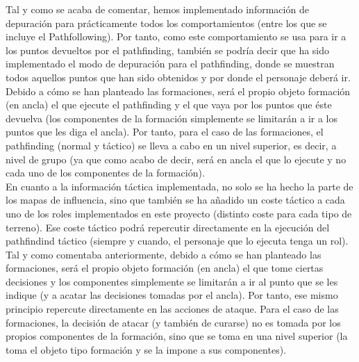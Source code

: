 Tal y como se acaba de comentar, hemos implementado información de depuración para prácticamente todos los comportamientos (entre los que se incluye el Pathfollowing). Por tanto, como este comportamiento se usa para ir a los puntos devueltos por el pathfinding, también se podría decir que ha sido implementado el modo de depuración para el pathfinding, donde se muestran todos aquellos puntos que han sido obtenidos y por donde el personaje deberá ir. \\

Debido a cómo se han planteado las formaciones, será el propio objeto formación (en ancla) el que ejecute el pathfinding y el que vaya por los puntos que éste devuelva (los componentes de la formación simplemente se limitarán a ir a los puntos que les diga el ancla). Por tanto, para el caso de las formaciones, el pathfinding (normal y táctico) se lleva a cabo en un nivel superior, es decir, a nivel de grupo (ya que como acabo de decir, será en ancla el que lo ejecute y no cada uno de los componentes de la formación). \\

En cuanto a la información táctica implementada, no solo se ha hecho la parte de los mapas de influencia, sino que también se ha añadido un coste táctico a cada uno de los roles implementados en este proyecto (distinto coste para cada tipo de terreno). Ese coste táctico podrá repercutir directamente en la ejecución del pathfindind táctico (siempre y cuando, el personaje que lo ejecuta tenga un rol). \\

Tal y como comentaba anteriormente, debido a cómo se han planteado las formaciones, será el propio objeto formación (en ancla) el que tome ciertas decisiones y los componentes simplemente se limitarán a ir al punto que se les indique (y a acatar las decisiones tomadas por el ancla). Por tanto, ese mismo principio repercute directamente en las acciones de ataque. Para el caso de las formaciones, la decisión de atacar (y también de curarse) no es tomada por los propios componentes de la formación, sino que se toma en una nivel superior (la toma el objeto tipo formación y se la impone a sus componentes).



